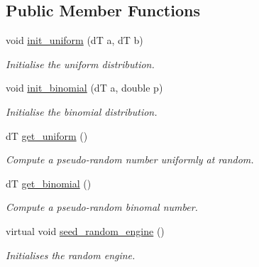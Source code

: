 \subsection*{Public Member Functions}
\begin{DoxyCompactItemize}
\item 
void \hyperlink{classlgraph_1_1utils_1_1drandom__generator_a38c5b5c981d635aac32f632a0f4a0092}{init\+\_\+uniform} (dT a, dT b)
\begin{DoxyCompactList}\small\item\em Initialise the uniform distribution. \end{DoxyCompactList}\item 
void \hyperlink{classlgraph_1_1utils_1_1drandom__generator_acae17810176a40fdfd8a4a260892361e}{init\+\_\+binomial} (dT a, double p)
\begin{DoxyCompactList}\small\item\em Initialise the binomial distribution. \end{DoxyCompactList}\item 
dT \hyperlink{classlgraph_1_1utils_1_1drandom__generator_a7735e31610688246957518795169bae3}{get\+\_\+uniform} ()\hypertarget{classlgraph_1_1utils_1_1drandom__generator_a7735e31610688246957518795169bae3}{}\label{classlgraph_1_1utils_1_1drandom__generator_a7735e31610688246957518795169bae3}

\begin{DoxyCompactList}\small\item\em Compute a pseudo-\/random number uniformly at random. \end{DoxyCompactList}\item 
dT \hyperlink{classlgraph_1_1utils_1_1drandom__generator_ac6062b1bbf3ed3a45bdab7474f466b7f}{get\+\_\+binomial} ()\hypertarget{classlgraph_1_1utils_1_1drandom__generator_ac6062b1bbf3ed3a45bdab7474f466b7f}{}\label{classlgraph_1_1utils_1_1drandom__generator_ac6062b1bbf3ed3a45bdab7474f466b7f}

\begin{DoxyCompactList}\small\item\em Compute a pseudo-\/random binomal number. \end{DoxyCompactList}\item 
virtual void \hyperlink{classlgraph_1_1utils_1_1random__generator_a4eb6998070eecb59bd89dca92d8a509c}{seed\+\_\+random\+\_\+engine} ()\hypertarget{classlgraph_1_1utils_1_1random__generator_a4eb6998070eecb59bd89dca92d8a509c}{}\label{classlgraph_1_1utils_1_1random__generator_a4eb6998070eecb59bd89dca92d8a509c}

\begin{DoxyCompactList}\small\item\em Initialises the random engine. \end{DoxyCompactList}\end{DoxyCompactItemize}
